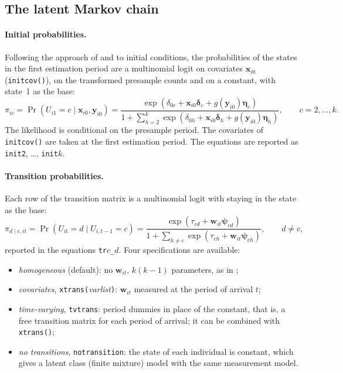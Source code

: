 \documentclass[11pt,a4paper]{article}
\newcommand{\cmd}[1]{\texttt{#1}}
\newcommand{\yv}{\mathbf y}
\newcommand{\xv}{\mathbf x}
\newcommand{\wv}{\mathbf w}
\begin{document}
\subsection{The latent Markov chain}

\paragraph{Initial probabilities.} Following the approach of \citet{heckman1981} and
\citet{wooldridge2005} to initial conditions, the probabilities of the states in the first estimation
period are a multinomial logit on covariates $\xv_{i0}$ (\cmd{initcov()}), on the transformed
presample counts and on a constant, with state~1 as the base:
\begin{equation}
\pi_{ic}=\Pr(U_{i1}=c\mid\xv_{i0},\yv_{i0})=
\frac{\exp(\delta_{0c}+\xv_{i0}\bm\delta_c+g(\yv_{i0})\bm\eta_c)}
{1+\sum_{h=2}^{k}\exp(\delta_{0h}+\xv_{i0}\bm\delta_h+g(\yv_{i0})\bm\eta_h)},\qquad c=2,\dots,k.
\end{equation}
The likelihood is conditional on the presample period. The covariates of \cmd{initcov()} are taken at
the first estimation period. The equations are reported as \cmd{init2}, \dots, \cmd{init}$k$.

\paragraph{Transition probabilities.} Each row of the transition matrix is a multinomial logit with
staying in the state as the base:
\begin{equation}\label{eq:trans}
\pi_{d\mid c,it}=\Pr(U_{it}=d\mid U_{i,t-1}=c)=
\frac{\exp(\tau_{cd}+\wv_{it}\bm\psi_{cd})}{1+\sum_{h\ne c}\exp(\tau_{ch}+\wv_{it}\bm\psi_{ch})},
\qquad d\ne c,
\end{equation}
reported in the equations \cmd{tr}$c$\cmd{\_}$d$. Four specifications are available:
\begin{itemize}
\item \emph{homogeneous} (default): no $\wv_{it}$, $k(k-1)$ parameters, as in \citet{laudicella2022};
\item \emph{covariates}, \cmd{xtrans(}\textit{varlist}\cmd{)}: $\wv_{it}$ measured at the period of
arrival $t$;
\item \emph{time-varying}, \cmd{tvtrans}: period dummies in place of the constant, that is, a free
transition matrix for each period of arrival; it can be combined with \cmd{xtrans()};
\item \emph{no transitions}, \cmd{notransition}: the state of each individual is constant, which gives
a latent class (finite mixture) model with the same measurement model.
\end{itemize}
\end{document}
